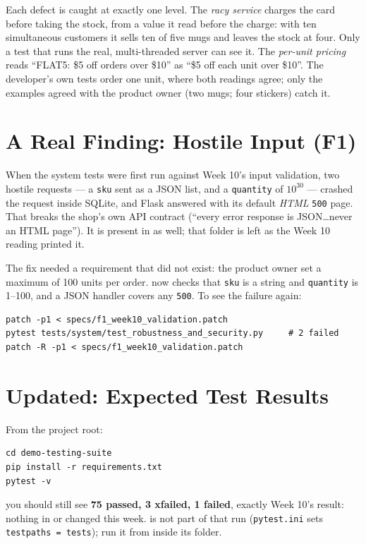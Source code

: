 \documentclass[11pt]{article}
\begin{document}
Each defect is caught at exactly one level. The \emph{racy service}
charges the card before taking the stock, from a value it read before
the charge: with ten simultaneous customers it sells ten of five mugs
and leaves the stock at four. Only a test that runs the real,
multi-threaded server can see it. The \emph{per-unit pricing} reads
``FLAT5: \$5 off orders over \$10'' as ``\$5 off each unit over \$10''.
The developer's own tests order one unit, where both readings agree;
only the examples agreed with the product owner (two mugs; four
stickers) catch it.

\section{A Real Finding: Hostile Input (F1)}
When the system tests were first run against Week 10's input
validation, two hostile requests --- a \texttt{sku} sent as a JSON list,
and a \texttt{quantity} of $10^{30}$ --- crashed the request inside
SQLite, and Flask answered with its default \emph{HTML} \texttt{500}
page. That breaks the shop's own API contract (``every error response
is JSON\ldots never an HTML page''). It is present in
 as well; that folder is left as the
Week 10 reading printed it.

The fix needed a requirement that did not exist: the product owner set
a maximum of 100 units per order.  now checks
that \texttt{sku} is a string and \texttt{quantity} is 1--100, and a
JSON handler covers any \texttt{500}. To see the failure again:
\begin{lstlisting}[style=shellstyle]
patch -p1 < specs/f1_week10_validation.patch
pytest tests/system/test_robustness_and_security.py     # 2 failed
patch -R -p1 < specs/f1_week10_validation.patch
\end{lstlisting}

\section{Updated: Expected Test Results}
From the project root:
\begin{lstlisting}[style=shellstyle]
cd demo-testing-suite
pip install -r requirements.txt
pytest -v
\end{lstlisting}
you should still see \textbf{75 passed, 3 xfailed, 1 failed}, exactly
Week 10's result: nothing in  or  changed this
week.  is not part of that run
(\texttt{pytest.ini} sets \texttt{testpaths = tests}); run it from inside
its folder.
\end{document}

